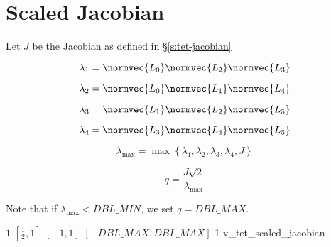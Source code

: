 \section{Scaled Jacobian}

Let $J$ be the Jacobian as defined in \S\ref{s:tet-jacobian}

\[
\lambda_1 = \normvec{ L_0 }
            \normvec{ L_2 }
            \normvec{ L_3 }  
\]

\[
\lambda_2 = \normvec{ L_0 }
            \normvec{ L_1 }
            \normvec{ L_4 }  
\]

\[
\lambda_3 = \normvec{ L_1 }
            \normvec{ L_2 }
            \normvec{ L_5 }  
\]

\[
\lambda_4 = \normvec{ L_3 }
            \normvec{ L_4 }
            \normvec{ L_5 }  
\]


\[
\lambda_{\max} = \max\left\{\lambda_1, \lambda_2, \lambda_3, \lambda_4, J\right\} 
\]

\begin{equation*}
q = \frac{J\sqrt{2}}{\lambda_{\max}}
\end{equation*}

Note that if $\lambda_{\max} < DBL\_MIN$, we set $q = DBL\_MAX$.

%
{$1$}%
{$[\frac{1}{2},1]$}%
{$[-1,1]$}%
{$[-DBL\_MAX,DBL\_MAX]$}%
{1}%
{\cite{knu:00}}%
{v\_tet\_scaled\_jacobian}%

